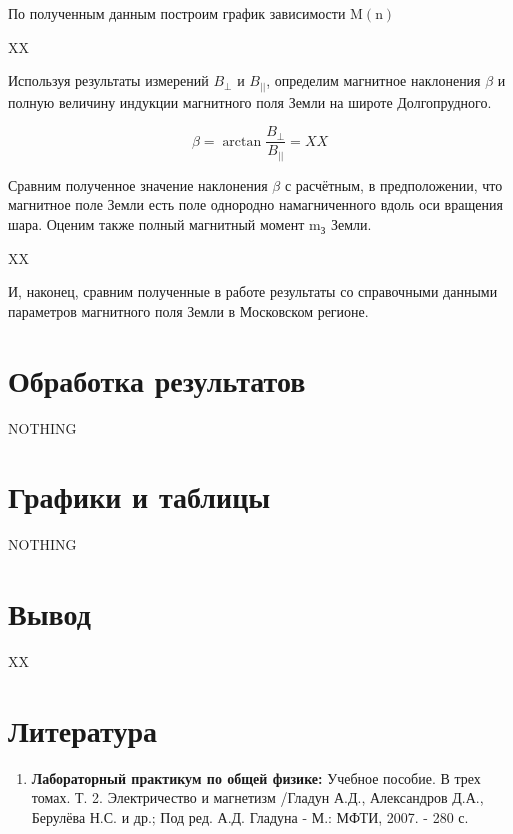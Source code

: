 \documentclass[a4paper, 12pt]{article}%
\begin{document}
По полученным данным построим график зависимости $\mathrm{M}(\mathrm{n})$


XX

Используя результаты измерений $B_{\perp}$ и $B_{||}$, определим магнитное наклонения $\beta$ и полную величину индукции магнитного поля Земли на широте Долгопрудного.

\[ \beta = \arctan{\frac{B_{\perp}}{B_{||}}} = XX \]

Сравним полученное значение наклонения $\beta$ с расчётным, в предположении, что магнитное поле Земли есть поле однородно намагниченного вдоль оси вращения шара. Оценим также полный магнитный
момент $\mathrm{m}_{\text{З}}$ Земли.

XX

И, наконец, сравним полученные в работе результаты со справочными данными параметров магнитного поля Земли в Московском регионе.





\section{Обработка результатов}

NOTHING

\section{Графики и таблицы}

NOTHING

\section{Вывод}

XX

\section{Литература}

\begin{enumerate}
\item \textbf{Лабораторный практикум по общей физике:} Учебное пособие. В трех томах. Т. 2. Электричество и магнетизм /Гладун А.Д., Александров Д.А., Берулёва Н.С. и др.; Под ред. А.Д. Гладуна - М.: МФТИ, 2007. - 280 с.
\end{enumerate}		
		
\end{document}
